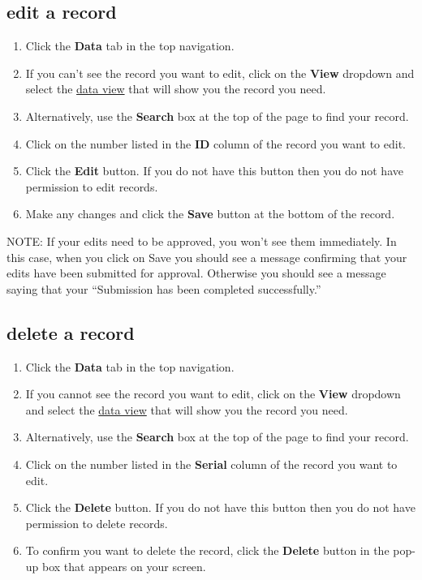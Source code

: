 \documentclass{ctrlo-int-toc}
\begin{document}
\subsection[edit a record]{edit a record}
\label{subsec:editrecord}
\begin{enumerate}
\item Click the \textbf{Data} tab in the top navigation.
\item If you can't see the record you want to edit, click on the \textbf{View} dropdown and select the \hyperref[sec:views]{data view} that will show you the record you need.
\item Alternatively, use the \textbf{Search} box at the top of the page to find your record.
\item Click on the number listed in the \textbf{ID} column of the record you want to edit.
\item Click the \textbf{Edit} button. If you do not have this button then you do not have permission to edit records.
\item Make any changes and click the \textbf{Save} button at the bottom of the record.
\end{enumerate}
\begin{notebox}
NOTE: If your edits need to be approved, you won't see them immediately. In this case, when you click on Save you should see a message confirming that your edits have been submitted for approval. Otherwise you should see a message saying that your ``Submission has been completed successfully.''
\end{notebox}

\subsection[delete a record]{delete a record}
\begin{enumerate}
\item Click the \textbf{Data} tab in the top navigation.
\item If you cannot see the record you want to edit, click on the \textbf{View} dropdown and select the \hyperref[sec:views]{data view} that will show you the record you need.
\item Alternatively, use the \textbf{Search} box at the top of the page to find your record.
\item Click on the number listed in the \textbf{Serial} column of the record you want to edit.
\item Click the \textbf{Delete} button. If you do not have this button then you do not have permission to delete records.
\item To confirm you want to delete the record, click the \textbf{Delete} button in the pop-up box that appears on your screen. 
\end{enumerate}
\end{document}
